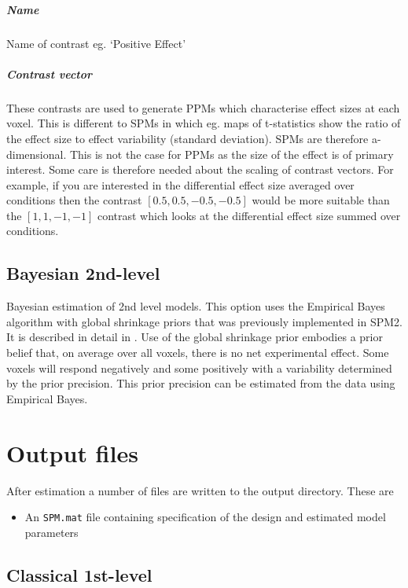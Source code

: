\documentclass[a4paper,titlepage]{book}
\begin{document}
\subparagraph{Name}
Name of contrast eg. `Positive Effect'


\subparagraph{Contrast vector}
These contrasts are used to generate PPMs which characterise effect sizes at each voxel. This is different to SPMs in which eg. maps of t-statistics show the ratio of the effect size to effect variability (standard deviation). SPMs are therefore a-dimensional. This is not the case for PPMs as the size of the effect is of primary interest. Some care is therefore needed about the scaling of contrast vectors. For example, if you are interested in the differential effect size averaged over conditions then the contrast $[0.5, 0.5, -0.5, -0.5]$ would be more suitable than the $[1, 1, -1, -1]$ contrast which looks at the differential effect size summed over conditions. 


\subsection{Bayesian 2nd-level}
Bayesian estimation of 2nd level models. This option uses the Empirical Bayes algorithm with global shrinkage priors that was previously implemented in SPM2. It is described in detail in \cite{karl_posterior}.
Use of the global shrinkage prior embodies a prior belief that, on average over all voxels, there is no net experimental effect. Some voxels will respond negatively and some positively with a variability determined by the prior precision. This prior precision can be estimated from the data using Empirical Bayes. 

\section{Output files}

After estimation a number of files are written to the
output directory. These are
\begin{itemize}
\item{An \verb!SPM.mat! file containing specification of the design and estimated model parameters}
\end{itemize}

\subsection{Classical 1st-level}
\end{document}
